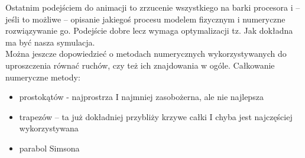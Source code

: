 Ostatnim podejściem do animacji to zrzucenie wszystkiego na barki procesora i – jeśli to możliwe – opisanie jakiegoś procesu modelem fizycznym i numeryczne rozwiązywanie go. Podejście dobre lecz wymaga optymalizacji tz. Jak dokładna ma być nasza symulacja. \\

Można jeszcze dopowiedzieć o metodach numerycznych wykorzystywanych do uproszczenia równać ruchów, czy też ich znajdowania w ogóle.
Całkowanie numeryczne metody:

\begin{itemize}
	\item prostokątów - najprostrza I najmniej zasobożerna, ale nie najlepsza
	\item trapezów – ta już dokładniej przybliży krzywe całki I chyba jest najczęściej wykorzystywana
	\item parabol Simsona \\
\end{itemize}
